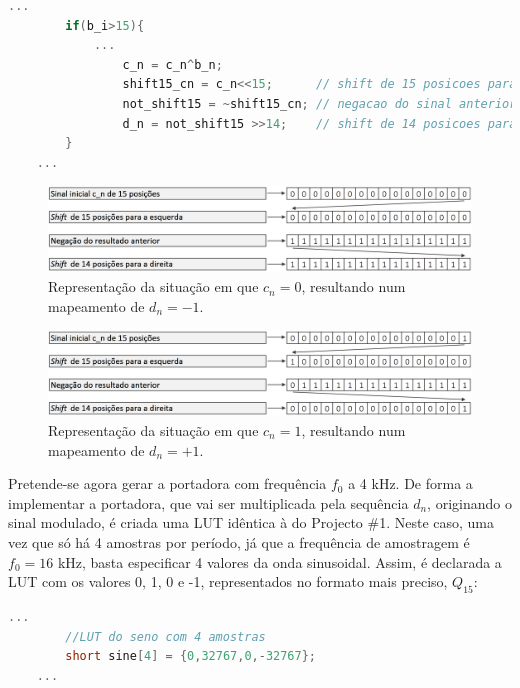 \documentclass[11pt]{article}
\numberwithin{equation}{section}
\begin{document}
\begin{lstlisting}[language=C]
	...
		if(b_i>15){
			...
				c_n = c_n^b_n;
				shift15_cn = c_n<<15;	   // shift de 15 posicoes para a esquerda
				not_shift15 = ~shift15_cn; // negacao do sinal anterior 
				d_n = not_shift15 >>14;    // shift de 14 posicoes para a direita
		}
	...
\end{lstlisting}


\begin{figure}[H]
	\centering
	\includegraphics[keepaspectratio=true, scale=0.30]{teoricas/esquema2}
	\caption{Representação da situação em que $c_{n} = 0$, resultando num mapeamento de $d_{n} = -1$.}
	\vspace{-0.8em}
\end{figure}

\begin{figure}[H]
	\centering
	\includegraphics[keepaspectratio=true, scale=0.30]{teoricas/esquema1}
	\caption{Representação da situação em que $c_{n} = 1$, resultando num mapeamento de $d_{n} = +1$.}
	\vspace{-0.8em}
\end{figure}

Pretende-se agora gerar a portadora com frequência $f_0$  a 4 kHz. De forma a implementar a portadora, que vai ser multiplicada pela sequência $d_n$, originando o sinal modulado, é criada uma LUT idêntica à do Projecto \#1. Neste caso, uma vez que só há 4 amostras por período, já que a frequência de amostragem é 
$f_0 = 16$ kHz, basta especificar 4 valores da onda sinusoidal. Assim, é declarada a LUT com os valores 0, 1, 0 e -1, representados no formato mais preciso, $Q_{15}$:

\begin{lstlisting}[language=C]
	...
		//LUT do seno com 4 amostras
		short sine[4] = {0,32767,0,-32767};
	...
\end{lstlisting}
\end{document}
